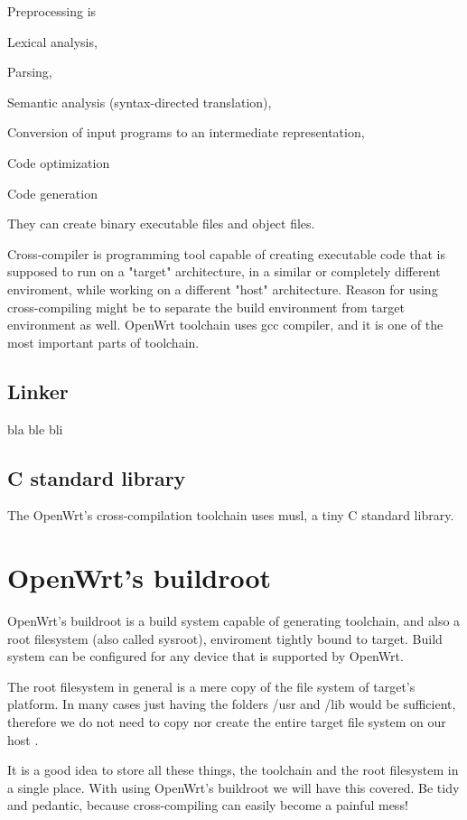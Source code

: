 Preprocessing is

Lexical analysis,

Parsing,

Semantic analysis (syntax-directed translation),

Conversion of input programs to an intermediate representation,

Code optimization

Code generation

They can create binary executable files and object files.

Cross-compiler is programming tool capable of creating executable code that is supposed to run on a "target" architecture, in a similar or completely different enviroment, while working on a different "host" architecture.
Reason for using cross-compiling might be to separate the build environment from target environment as well.
OpenWrt toolchain uses gcc compiler, and it is one of the most important parts of toolchain.

\subsection{Linker}

bla ble bli

\subsection{C standard library}

The OpenWrt's cross-compilation toolchain uses musl, a tiny C standard library.

\section{OpenWrt's buildroot}

OpenWrt's buildroot is a build system capable of generating toolchain, and also a root filesystem (also called sysroot), enviroment tightly bound to target.
Build system can be configured for any device that is supported by OpenWrt.

The root filesystem in general is a mere copy of the file system of target's platform.
In many cases just having the folders /usr and /lib would be sufficient, therefore we do not need to copy nor create the entire target file system on our host .

It is a good idea to store all these things, the toolchain and the root filesystem in a single place.
With using OpenWrt's buildroot we will have this covered.
Be tidy and pedantic, because cross-compiling can easily become a painful mess!

